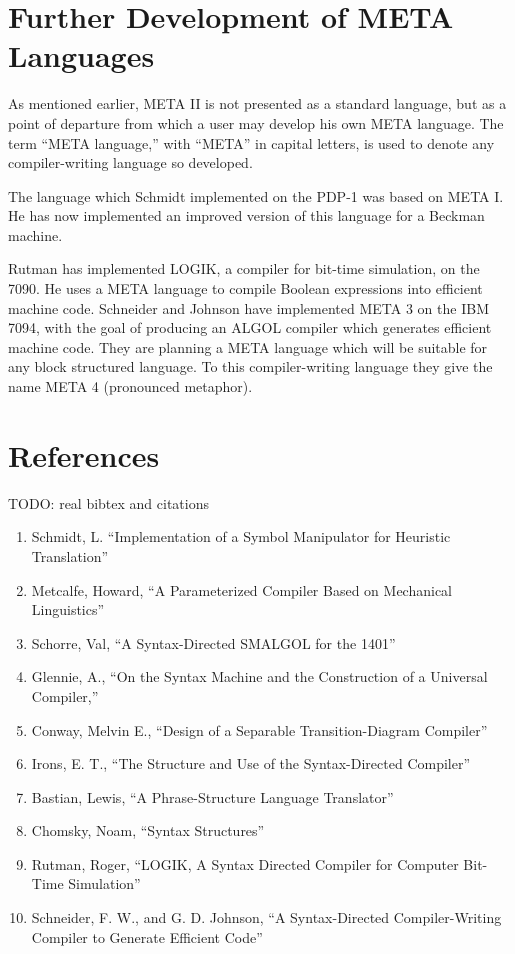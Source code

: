 \documentclass[twocolumn]{article}
\begin{document}
\section{Further Development of META Languages}

As mentioned earlier, META II is not presented as a standard language, but
as a point of departure from which a user may develop his own META language.
The term ``META language,'' with ``META'' in capital letters, is used to
denote any compiler-writing language so developed.

The language which Schmidt implemented on the PDP-1 was based on META I.
He has now implemented an improved version of this language for a Beckman
machine.

Rutman has implemented LOGIK, a compiler for bit-time simulation, on the 7090.
He uses a META language to compile Boolean expressions into efficient machine
code.
Schneider and Johnson have implemented META 3 on the IBM 7094, with the goal of
producing an ALGOL compiler which generates efficient machine code.
They are planning a META language which will be suitable for any block
structured language.
To this compiler-writing language they give the name META 4 (pronounced metaphor).

\section{References}

TODO: real bibtex and citations

\begin{enumerate}
\item Schmidt, L. ``Implementation of a Symbol Manipulator for Heuristic Translation''
\item Metcalfe, Howard, ``A Parameterized Compiler Based on Mechanical Linguistics''
\item Schorre, Val, ``A Syntax-Directed SMALGOL for the 1401''
\item Glennie, A., ``On the Syntax Machine and the Construction of a Universal Compiler,''
\item Conway, Melvin E., ``Design of a Separable Transition-Diagram Compiler''
\item Irons, E. T., ``The Structure and Use of the Syntax-Directed Compiler''
\item Bastian, Lewis, ``A Phrase-Structure Language Translator''
\item Chomsky, Noam, ``Syntax Structures''
\item Rutman, Roger, ``LOGIK, A Syntax Directed Compiler for Computer Bit-Time Simulation''
\item Schneider, F. W., and G. D. Johnson, ``A Syntax-Directed Compiler-Writing Compiler to Generate Efficient Code''
\end{enumerate}
\end{document}
